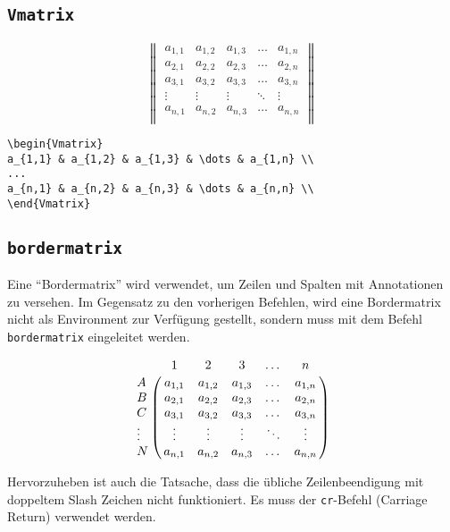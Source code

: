 \subsection{\texttt{Vmatrix}}

\begin{equation*}
\begin{Vmatrix}
a_{1,1} & a_{1,2} & a_{1,3} & \dots & a_{1,n} \\
a_{2,1} & a_{2,2} & a_{2,3} & \dots & a_{2,n} \\
a_{3,1} & a_{3,2} & a_{3,3} & \dots & a_{3,n} \\
\vdots & \vdots & \vdots & \ddots & \vdots \\
a_{n,1} & a_{n,2} & a_{n,3} & \dots & a_{n,n} \\
\end{Vmatrix}
\end{equation*}
\begin{verbatim}
\begin{Vmatrix}
a_{1,1} & a_{1,2} & a_{1,3} & \dots & a_{1,n} \\
...
a_{n,1} & a_{n,2} & a_{n,3} & \dots & a_{n,n} \\
\end{Vmatrix}
\end{verbatim}

\subsection{\texttt{bordermatrix}}

Eine "`Bordermatrix"' wird verwendet, um Zeilen und Spalten mit Annotationen zu versehen. Im Gegensatz zu den vorherigen Befehlen, wird eine Bordermatrix nicht als Environment zur Verfügung gestellt, sondern muss mit dem Befehl \texttt{bordermatrix} eingeleitet werden.

\begin{equation*}
\bordermatrix{
 & 1 & 2 & 3 & \dots & n \cr
A & a_{1,1} & a_{1,2} & a_{1,3} & \dots & a_{1,n} \cr
B & a_{2,1} & a_{2,2} & a_{2,3} & \dots & a_{2,n} \cr
C & a_{3,1} & a_{3,2} & a_{3,3} & \dots & a_{3,n} \cr
\vdots & \vdots & \vdots & \vdots & \ddots & \vdots \cr
N & a_{n,1} & a_{n,2} & a_{n,3} & \dots & a_{n,n} \cr
}
\end{equation*}

Hervorzuheben ist auch die Tatsache, dass die übliche Zeilenbeendigung mit doppeltem Slash Zeichen nicht funktioniert. Es muss der \texttt{cr}-Befehl (Carriage Return) verwendet werden.

